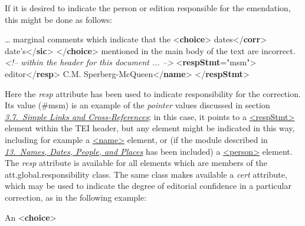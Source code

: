 If it is desired to indicate the person or edition responsible for the emendation, this might be done as follows: \par\bgroup{}\exampleFont \begin{shaded}\noindent\mbox{}… marginal comments which indicate that the\mbox{}\newline 
{<\textbf{choice}>}\mbox{}\newline 
{}dates{</\textbf{corr}>}\mbox{}\newline 
{}date's{</\textbf{sic}>}\mbox{}\newline 
{</\textbf{choice}>} mentioned in the main body of the text are\mbox{}\newline 
 incorrect.\mbox{}\newline 
\mbox{}\newline 
\textit{<!-- within the header for this document ... -->}\mbox{}\newline 
{<\textbf{respStmt}\hspace*{1em}{xml:id}="{msm}">}\mbox{}\newline 
{}editor{</\textbf{resp}>}\mbox{}\newline 
{}C.M. Sperberg-McQueen{</\textbf{name}>}\mbox{}\newline 
{</\textbf{respStmt}>}\end{shaded}\egroup\par \noindent Here the {\itshape resp} attribute has been used to indicate responsibility for the correction. Its value (\#msm) is an example of the \textit{pointer} values discussed in section \textit{\hyperref[COXR]{3.7.\ Simple Links and Cross-References}}; in this case, it points to a \hyperref[TEI.respStmt]{<respStmt>} element within the TEI header, but any element might be indicated in this way, including for example a \hyperref[TEI.name]{<name>} element, or (if the module described in \textit{\hyperref[ND]{13.\ Names, Dates, People, and Places}} has been included) a \hyperref[TEI.person]{<person>} element. The {\itshape resp} attribute is available for all elements which are members of the \textsf{att.global.responsibility} class. The same class makes available a {\itshape cert} attribute, which may be used to indicate the degree of editorial confidence in a particular correction, as in the following example: \par\bgroup{}\exampleFont \begin{shaded}\noindent\mbox{}An {<\textbf{choice}>}\mbox{}\newline 

\end{shaded}
